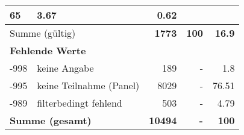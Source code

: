 \begin{longtable}{lXrrr}
       \num{65} &
       \num[round-mode=places,round-precision=2]{3.67} &
         \num[round-mode=places,round-precision=2]{0.62} \\
     \midrule
     \multicolumn{2}{l}{Summe (gültig)} &
       \textbf{\num{1773}} &
     \textbf{\num{100}} &
       \textbf{\num[round-mode=places,round-precision=2]{16.9}} \\
     \multicolumn{5}{l}{\textbf{Fehlende Werte}}\\
       -998 &
       keine Angabe &
         \num{189} &
        - &
         \num[round-mode=places,round-precision=2]{1.8} \\
       -995 &
       keine Teilnahme (Panel) &
         \num{8029} &
        - &
         \num[round-mode=places,round-precision=2]{76.51} \\
       -989 &
       filterbedingt fehlend &
         \num{503} &
        - &
         \num[round-mode=places,round-precision=2]{4.79} \\
     \midrule
     \multicolumn{2}{l}{\textbf{Summe (gesamt)}} &
          \textbf{\num{10494}} &
        \textbf{-} &
        \textbf{\num{100}} \\
     \bottomrule
     \end{longtable}
     
